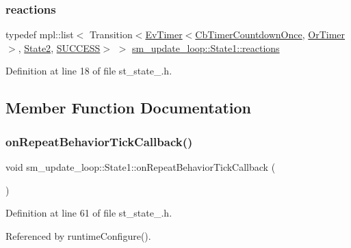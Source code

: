 \subsubsection{\texorpdfstring{reactions}{reactions}}
{\footnotesize\ttfamily typedef mpl\+::list$<$ Transition$<$\hyperlink{structcl__ros__timer_1_1EvTimer}{Ev\+Timer}$<$\hyperlink{classcl__ros__timer_1_1CbTimerCountdownOnce}{Cb\+Timer\+Countdown\+Once}, \hyperlink{classsm__update__loop_1_1OrTimer}{Or\+Timer}$>$, \hyperlink{structsm__update__loop_1_1State2}{State2}, \hyperlink{structsmacc_1_1default__transition__tags_1_1SUCCESS}{S\+U\+C\+C\+E\+SS}$>$ $>$ \hyperlink{structsm__update__loop_1_1State1_a828232579aa51d4fbfe9858c2a7016ad}{sm\+\_\+update\+\_\+loop\+::\+State1\+::reactions}}



Definition at line 18 of file st\+\_\+state\+\_.\+h.



\subsection{Member Function Documentation}
\mbox{\label{structsm__update__loop_1_1State1_aba8ce8c18482665237b1a5cb28deb657}} 
\subsubsection{\texorpdfstring{on\+Repeat\+Behavior\+Tick\+Callback()}{onRepeatBehaviorTickCallback()}}
{\footnotesize\ttfamily void sm\+\_\+update\+\_\+loop\+::\+State1\+::on\+Repeat\+Behavior\+Tick\+Callback (\begin{DoxyParamCaption}{ }\end{DoxyParamCaption})\hspace{0.3cm}{\ttfamily [inline]}}



Definition at line 61 of file st\+\_\+state\+\_.\+h.



Referenced by runtime\+Configure().



